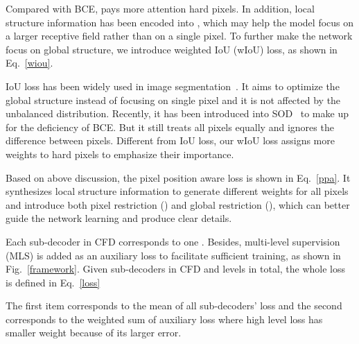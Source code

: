 \documentclass[letterpaper]{article} \usepackage{aaai20}  \usepackage{times}  \usepackage{helvet} \usepackage{courier}  \usepackage[hyphens]{url}  \usepackage{graphicx} \urlstyle{rm} \def\UrlFont{\rm}  \usepackage{graphicx}  \frenchspacing  \setlength{\pdfpagewidth}{8.5in}  \setlength{\pdfpageheight}{11in}
\begin{document}
Compared with BCE,  pays more attention hard pixels. In addition, local structure information has been encoded into , which may help the model focus on a larger receptive field rather than on a single pixel. To further make the network focus on global structure, we introduce weighted IoU (wIoU) loss, as shown in Eq.~\ref{wiou}.
\begin{small}

\end{small}
IoU loss has been widely used in image segmentation~\cite{IOU}. It aims to optimize the global structure instead of focusing on single pixel and it is not affected by the unbalanced distribution. Recently, it has been introduced into SOD~\cite{BASNet} to make up for the deficiency of BCE. But it still treats all pixels equally and ignores the difference between pixels. Different from IoU loss, our wIoU loss assigns more weights to hard pixels to emphasize their importance. 

Based on above discussion, the pixel position aware loss is shown in Eq.~\ref{ppa}. It synthesizes local structure information to generate different weights for all pixels and introduce both pixel restriction () and global restriction (), which can better guide the network learning and produce clear details.

Each sub-decoder in CFD corresponds to one . Besides, multi-level supervision (MLS) is added as an auxiliary loss to facilitate sufficient training, as shown in Fig.~\ref{framework}. Given  sub-decoders in CFD and  levels in total, the whole loss is defined in Eq.~\ref{loss}

The first item corresponds to the mean of all sub-decoders' loss and the second corresponds to the weighted sum of auxiliary loss where high level loss has smaller weight because of its larger error.
\end{document}
